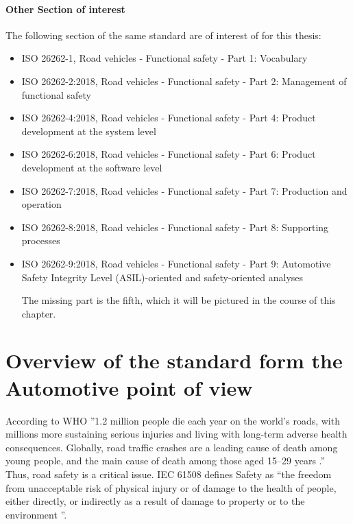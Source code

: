 \documentclass[./dissertation.tex]{subfiles}
\begin{document}
\paragraph{Other Section of interest}
The following section of the same standard are of interest of for this thesis:
\begin{itemize}
\item ISO 26262-1, Road vehicles - Functional safety - Part 1: Vocabulary \cite{iso26262-1}
\item ISO 26262-2:2018, Road vehicles - Functional safety - Part 2: Management of functional safety \cite{iso26262-2}
\item ISO 26262-4:2018, Road vehicles - Functional safety - Part 4: Product development at the system level \cite{iso26262-4}
\item ISO 26262-6:2018, Road vehicles - Functional safety - Part 6: Product development at the software level \cite{iso26262-6}
\item ISO 26262-7:2018, Road vehicles - Functional safety - Part 7: Production and operation \cite{iso26262-7}
\item ISO 26262-8:2018, Road vehicles - Functional safety - Part 8: Supporting processes \cite{iso26262-8}
\item ISO 26262-9:2018, Road vehicles - Functional safety - Part 9: Automotive Safety Integrity Level (ASIL)-oriented and safety-oriented analyses \cite{iso26262-9}

The missing part is the fifth, which it will be pictured in the course of this chapter.
\end{itemize}



\section{Overview of the standard form the Automotive point of view}

According to WHO ”1.2 million people die each year on the world's roads, with millions more sustaining serious injuries and living with long-term adverse health consequences. Globally, road traffic crashes are a leading cause of death among young people, and the main cause of death among those aged 15–29 years \cite{yeung-2018}.” Thus, road safety is a critical issue. IEC 61508 defines Safety as “the freedom from unacceptable risk of physical injury or of damage to the health of people, either directly, or indirectly as a result of damage to property or to the environment \cite{bell2006introduction}”.
\end{document}
